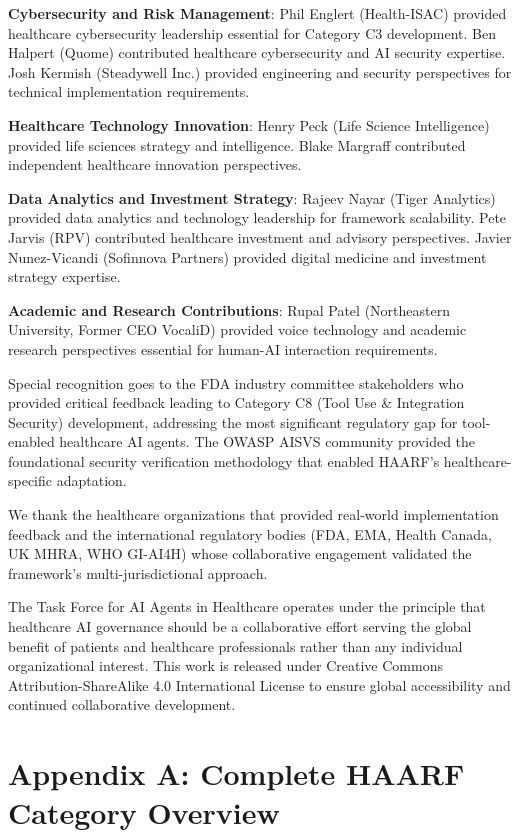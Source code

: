\documentclass[11pt]{article}
\begin{document}
\textbf{Cybersecurity and Risk Management}: Phil Englert (Health-ISAC) provided healthcare cybersecurity leadership essential for Category C3 development. Ben Halpert (Quome) contributed healthcare cybersecurity and AI security expertise. Josh Kermish (Steadywell Inc.) provided engineering and security perspectives for technical implementation requirements.

\textbf{Healthcare Technology Innovation}: Henry Peck (Life Science Intelligence) provided life sciences strategy and intelligence. Blake Margraff contributed independent healthcare innovation perspectives.

\textbf{Data Analytics and Investment Strategy}: Rajeev Nayar (Tiger Analytics) provided data analytics and technology leadership for framework scalability. Pete Jarvis (RPV) contributed healthcare investment and advisory perspectives. Javier Nunez-Vicandi (Sofinnova Partners) provided digital medicine and investment strategy expertise.

\textbf{Academic and Research Contributions}: Rupal Patel (Northeastern University, Former CEO VocaliD) provided voice technology and academic research perspectives essential for human-AI interaction requirements.

Special recognition goes to the FDA industry committee stakeholders who provided critical feedback leading to Category C8 (Tool Use \& Integration Security) development, addressing the most significant regulatory gap for tool-enabled healthcare AI agents. The OWASP AISVS community provided the foundational security verification methodology that enabled HAARF's healthcare-specific adaptation.

We thank the healthcare organizations that provided real-world implementation feedback and the international regulatory bodies (FDA, EMA, Health Canada, UK MHRA, WHO GI-AI4H) whose collaborative engagement validated the framework's multi-jurisdictional approach.

The Task Force for AI Agents in Healthcare operates under the principle that healthcare AI governance should be a collaborative effort serving the global benefit of patients and healthcare professionals rather than any individual organizational interest. This work is released under Creative Commons Attribution-ShareAlike 4.0 International License to ensure global accessibility and continued collaborative development.




\section*{Appendix A: Complete HAARF Category Overview}
\end{document}
